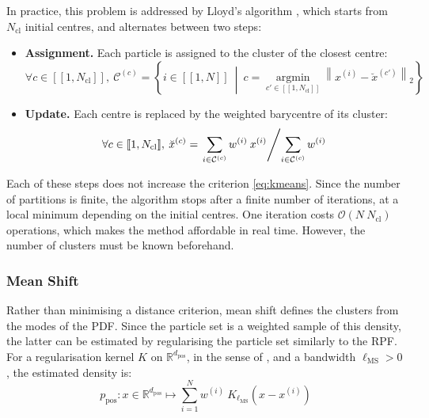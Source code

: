 In practice, this problem is addressed by Lloyd's algorithm \cite{bib:lloyd}, which starts from $N_{\mathrm{cl}}$ initial centres, and alternates between two steps:
\begin{itemize}
	\item\textbf{Assignment.} Each particle is assigned to the cluster of the closest centre:
	\begin{equation}
		\forall c\in[\![1,N_{\mathrm{cl}}]\!],\:\mathcal{C}^{(c)}=\left\{i\in[\![1,N]\!]\:\middle|\:c=\underset{c'\in[\![1,N_{\mathrm{cl}}]\!]}{\operatorname{argmin}}\left\|x^{(i)}-\breve{x}^{(c')}\right\|_2\right\}
	\end{equation}
	\item\textbf{Update.} Each centre is replaced by the weighted barycentre of its cluster:
	\begin{equation}
		\forall c\in[\![1,N_{\mathrm{cl}}]\!],\:\breve{x}^{(c)}=\left.\sum_{i\in\mathcal{C}^{(c)}}w^{(i)}\:x^{(i)}\middle/\sum_{i\in\mathcal{C}^{(c)}}w^{(i)}\right.
	\end{equation}
\end{itemize}

Each of these steps does not increase the criterion \eqref{eq:kmeans}. Since the number of partitions is finite, the algorithm stops after a finite number of iterations, at a local minimum depending on the initial centres. One iteration costs $\mathcal{O}(N\:N_{\mathrm{cl}})$ operations, which makes the method affordable in real time. However, the number of clusters must be known beforehand.

\subsubsection{Mean Shift}

Rather than minimising a distance criterion, mean shift \cite{bib:mean-shift,bib:mean-shift-clustering} defines the clusters from the modes of the PDF. Since the particle set is a weighted sample of this density, the latter can be estimated by regularising the particle set similarly to the RPF. For a regularisation kernel $K$ on $\mathbb{R}^{d_{\mathrm{pos}}}$, in the sense of , and a bandwidth $\ell_{\mathrm{MS}}>0$, the estimated density is:
\begin{equation}
	p_{\mathrm{pos}}:x\in\mathbb{R}^{d_{\mathrm{pos}}}\mapsto\sum_{i=1}^Nw^{(i)}\:K_{\ell_{\mathrm{MS}}}\left(x-x^{(i)}\right)
\end{equation}

